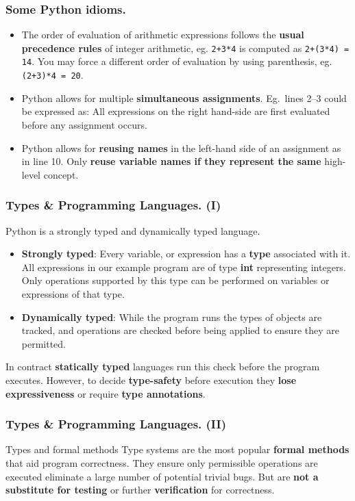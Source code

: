 \documentclass{beamer} %
\newcommand\emc[1]{\textcolor{brightblue}{\textbf{#1}}}
\begin{document}
\begin{frame}
\frametitle{Some Python idioms.}

\begin{itemize}
	\item The order of evaluation of arithmetic expressions follows the \emc{usual precedence rules} of integer arithmetic, eg. \texttt{2+3*4} is computed as \texttt{2+(3*4) = 14}. You may force a different order of evaluation by using parenthesis, eg. \texttt{(2+3)*4 = 20}.
	\item Python allows for multiple \emc{simultaneous assignments}. Eg.\ lines 2--3 could be expressed as:
	All expressions on the right hand-side are first evaluated before any assignment occurs.
	\item Python allows for \emc{reusing names} in the left-hand side of an assignment as in line 10.
	Only \emc{reuse variable names if they represent the same} high-level concept.

\end{itemize}

\end{frame}

\begin{frame}
\frametitle{Types \& Programming Languages. (I)}

Python is a strongly typed and dynamically typed language. 
\begin{itemize}
\item \emc{Strongly typed}: Every variable, or expression has a \emc{type} associated with it. All expressions in our example program are of type \emc{int} representing integers. Only operations supported by this type can be performed on variables or expressions of that type.
\item \emc{Dynamically typed}: While the program runs the types of objects are tracked, and operations are checked before being applied to ensure they are permitted. 
\end{itemize}

\vspace{5mm}
In contract \emc{statically typed} languages run this check before the program executes. However, to decide \emc{type-safety} before execution they \emc{lose expressiveness} or require \emc{type annotations}.

\end{frame}

\begin{frame}
\frametitle{Types \& Programming Languages. (II)}

\begin{block}{Types and formal methods}
Type systems are the most popular \emc{formal methods} that aid program correctness. They ensure only permissible operations are executed eliminate a large number of potential trivial bugs. But are \emc{not a substitute for testing} or further \emc{verification} for correctness.
\end{block}

\end{frame}
\end{document}
